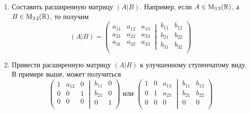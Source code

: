 \begin{enumerate}
\item Составить расширенную матрицу $(A|B)$.
Например, если $A\in \operatorname{M}_{3\,3}(\mathbb R)$, а $B\in \operatorname{M}_{3\,2}(\mathbb R)$, то получим
\[
(A|B) = 
\left(
\left.
\begin{matrix}
{a_{11}}&{a_{12}}&{a_{13}}\\
{a_{21}}&{a_{22}}&{a_{23}}\\
{a_{31}}&{a_{32}}&{a_{33}}\\
\end{matrix}
\:\right|\:
\begin{matrix}
{b_{11}}&{b_{12}}\\
{b_{21}}&{b_{22}}\\
{b_{31}}&{b_{32}}\\
\end{matrix}
\right)
\]

\item Привести расширенную матрицу $(A|B)$ к улучшенному ступенчатому виду.
В примере выше, может получиться
\[
\left(
\left.
\begin{matrix}
{1}&{a_{12}}&{0}\\
{0}&{0}&{1}\\
{0}&{0}&{0}\\
\end{matrix}
\:\right|\:
\begin{matrix}
{b_{11}}&{0}\\
{b_{21}}&{0}\\
{0}&{1}\\
\end{matrix}
\right)\text{ или }
\left(
\left.
\begin{matrix}
{1}&{0}&{a_{13}}\\
{0}&{1}&{a_{23}}\\
{0}&{0}&{0}\\
\end{matrix}
\:\right|\:
\begin{matrix}
{b_{11}}&{b_{12}}\\
{b_{21}}&{b_{22}}\\
{0}&{0}\\
\end{matrix}
\right)
\]


\end{enumerate}
